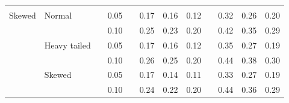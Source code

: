 \documentclass[12pt]{article} %
\begin{document}
\begin{table}[ht]
\begin{scriptsize}
\begin{center}
\begin{tabular}{ll p{.1cm} c p{.1cm} rrr p{.1cm} rrr}
             &&&&&&&&&&&\\
Skewed       & Normal       && 0.05 &&  0.17 & 0.16 & 0.12 && 0.32 & 0.26 & 0.20 \\ 
             &              && 0.10 &&  0.25 & 0.23 & 0.20 && 0.42 & 0.35 & 0.29 \\ 
             & Heavy tailed && 0.05 &&  0.17 & 0.16 & 0.12 && 0.35 & 0.27 & 0.19 \\ 
             &              && 0.10 &&  0.26 & 0.25 & 0.20 && 0.44 & 0.38 & 0.30 \\ 
             & Skewed       && 0.05 &&  0.17 & 0.14 & 0.11 && 0.33 & 0.27 & 0.19 \\ 
             &              && 0.10 &&  0.24 & 0.22 & 0.20 && 0.44 & 0.36 & 0.29 \\ 

\hline
\end{tabular}
\end{center}
\end{scriptsize}
\end{table}
\end{document}
